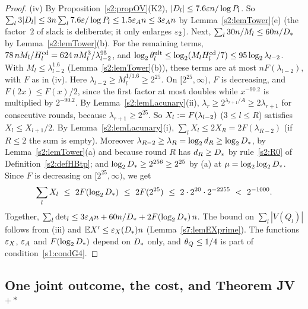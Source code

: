 \begin{proof}
(iv) By Proposition~\ref{s2:propOV}(K2), $|D_l|\le7.6\varepsilon n/\log P_l$. So
$\sum_l3|D_l|\le3n\sum_l7.6\varepsilon/\log P_l\le1.5\varepsilon_{A} n\le3\varepsilon_{A} n$ by
Lemma~\ref{s2:lemTower}(e) (the factor~$2$ of slack is deliberate; it only
enlarges $\varepsilon_{2}$). Next,
$\sum_l30n/M_l\le60n/D_{*}$ by Lemma~\ref{s2:lemTower}(b). For the remaining
terms, $78\,nM_l/H^{\mathrm{cd}}_l=624\,nM_l^3/\lambda_{l-2}^{95}$, and
$\log_2\theta^{\mathrm{ult}}_l\le\log_2(M_lH^{\mathrm{cd}}_l/7)\le95\log_2\lambda_{l-2}$. With
$M_l\le\lambda_{l-2}^{1.6}$ (Lemma~\ref{s2:lemTower}(b)), these terms are at most
$nF(\lambda_{l-2})$, with $F$ as in (iv).
Here $\lambda_{l-2}\ge M_l^{1/1.6}\ge2^{25}$. On $[2^{25},\infty)$, $F$ is
decreasing, and $F(2x)\le F(x)/2$, since the first factor at most doubles while
$x^{-90.2}$ is multiplied by $2^{-90.2}$. By Lemma~\ref{s2:lemLacunary}(ii),
$\lambda_{r}\ge2^{\lambda_{r+1}/A}\ge2\lambda_{r+1}$ for consecutive rounds,
because $\lambda_{r+1}\ge2^{25}$. So $X_l\mathrel{:=} F(\lambda_{l-2})$
($3\le l\le R$) satisfies $X_l\le X_{l+1}/2$. By
Lemma~\ref{s2:lemLacunary}(i), $\sum_lX_l\le2X_R=2F(\lambda_{R-2})$ (if $R\le2$
the sum is empty). Moreover $\lambda_{R-2}\ge\lambda_R=\log_2d_R\ge\log_2D_{*}$,
by Lemma~\ref{s2:lemTower}(a) and because round $R$ has $d_R\ge D_{*}$ by
rule~\ref{s2:R0} of Definition~\ref{s2:defHBtp}; and $\log_2D_{*}\ge2^{256}\ge2^{25}$ by (a) at $\mu=\log_2\log_2D_{*}$. Since $F$
is decreasing on $[2^{25},\infty)$, we get
\[
\sum_lX_l\ \le\ 2F(\log_2\Dstar)\ \le\ 2F(2^{25})\ \le\ 2\cdot2^{20}\cdot2^{-2255}\ <\ 2^{-1000}.
\]
Together, $\sum_l\mathrm{det}_l\le3\varepsilon_{A} n+60n/D_{*}+2F(\log_2D_{*})\,n$. The bound
on $\sum_l|V(Q_l)|$ follows from (iii) and $\mathbb{E}X'\le\varepsilon_{X}(D_{*})n$
(Lemma~\ref{s7:lemEXprime}). The functions $\varepsilon_{X}$, $\varepsilon_{A}$ and
$F(\log_2D_{*})$ depend on $D_{*}$ only, and $\theta_{Q}\le1/4$ is part of
condition~\ref{s1:condG4}.
\end{proof}

\subsection{One joint outcome, the cost, and Theorem \texorpdfstring{JV$^{+*}$}{JV+*}}

